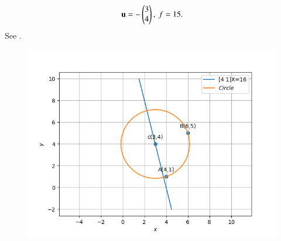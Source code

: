\begin{align}
	\mathbf{u} = -\begin{pmatrix}3\\4\end{pmatrix},\
	f = 15.
\end{align}
See .
\begin{figure}[!h]
	\begin{center} 
	    \includegraphics[width=\columnwidth]{chapters/11/11/1/10/figs/circ2}
	\end{center}
\caption{}
\label{fig:chapters/11/11/1/10Fig1}
\end{figure}





